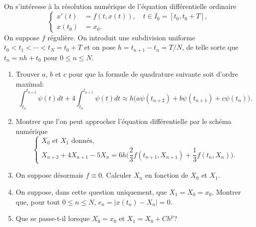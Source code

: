 \documentclass[a4paper,12pt,reqno]{amsart}
\begin{document}
\begin{exo}

  On s'intéresse à la résolution numérique de l'équation différentielle ordinaire
  \[
    \left \{
      \begin{aligned}
        x'(t)  &= f(t,x(t)), \quad t\in I_0=[t_0,t_0+T],\\
        x(t_0) &= x_0.
      \end{aligned}
    \right .
  \]
  On suppose $f$ régulière. On introduit une subdivision uniforme $t_0<t_1<\cdots<t_N=t_0+T$ et on pose $h=t_{n+1}-t_n=T/N$, de telle sorte que $t_n=nh+t_0$ pour $0\leq n\leq N$.
  \begin{enumerate}
    \item Trouver $a$, $b$ et $c$ pour que la formule de quadrature suivante soit d'ordre maximal:
      \[
        \int_{t_n}^{t_{n+2}}\psi(t) dt + 4 \int_{t_n}^{t_{n+1}}\psi(t) dt
          \approx
            h \big( a\psi(t_{n+2})+b\psi(t_{n+1}) + c\psi(t_n)\big).
      \]
    \item Montrer que l'on peut approcher l'équation différentielle par le schéma numérique
      \[
        \left\{
          \begin{array}{l}
            X_0 \text{ et } X_1 \text{ donnés,}\\
            X_{n+2} + 4 X_{n+1} - 5 X_n = 6 h\Big(\dfrac{2}{3} f(t_{n+1},X_{n+1}) +
             \dfrac{1}{3}  f(t_n,X_n)\Big).
          \end{array}
        \right.
      \]
    \item On suppose désormais $f\equiv0$. Calculer $X_n$ en fonction de $X_0$ et $X_1$.
    \item On suppose, dans cette question uniquement, que $X_1 = X_0 = x_0$. Montrer que, pour tout $0 \leq n \leq N$, $e_n = |x(t_n)-X_n| = 0$.
    \item Que se passe-t-il lorsque $X_0 = x_0$ et $X_1 = X_0 + C h^p$?
  \end{enumerate}
\end{exo}
\end{document}
